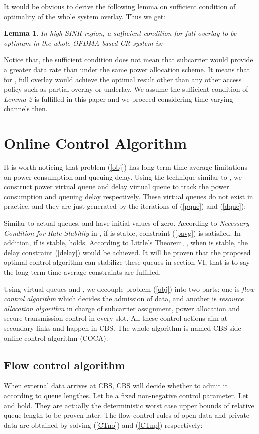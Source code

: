 \documentclass[journal]{IEEEtran}
\newtheorem{Lemma}{Lemma}
\begin{document}
 It would be obvious to derive the following lemma on sufficient condition of optimality of the whole system overlay.
 Thus we get:
 \begin{Lemma}
 In high SINR region, a sufficient condition for full overlay to be optimum in the whole OFDMA-based CR system is:

 \end{Lemma}

Notice that, the sufficient condition does not mean that subcarrier  would provide a greater data
rate than  under the same power allocation scheme. It means that for , full overlay would achieve the optimal result other than any other access policy such as partial
overlay or underlay.
 We assume the sufficient condition of \emph{Lemma 2} is fulfilled in this paper and we proceed considering time-varying
 channels then.
\section{Online Control Algorithm}
It is worth noticing that problem (\ref{obj}) has long-term time-average limitations on power consumption and queuing delay.
Using the technique similar to \cite{neely2010stochastic}, we construct power virtual queue   and delay virtual queue  to track the power consumption and queuing delay respectively. These virtual queues do not exist in practice, and
they are just generated by the iterations of (\ref{pque}) and (\ref{dque}):


Similar to actual queues,  and  have initial values of zero. According to \emph{Necessary Condition for Rate
Stability} in \cite{neely2010stochastic}, if    is stable, constraint (\ref{pavg}) is satisfied. In addition, if 
is stable,  holds.  According to Little's Theorem, ,  when  is stable, the
delay constraint (\ref{delay}) would be achieved.
It will be proven that the proposed optimal control algorithm can stabilize these queues in section VI, that is to say the
 long-term time-average constraints are fulfilled.


Using virtual queues  and , we decouple problem (\ref{obj}) into two parts: one is \emph{flow control
algorithm} which decides the admission of data, and another is \emph{resource allocation algorithm} in charge of
subcarrier assignment, power allocation and  secure transmission control in every slot. All these control actions aim at
secondary links and happen in CBS. The whole algorithm is named CBS-side online control algorithm (COCA).
\subsection{Flow control algorithm}
When external data arrives at CBS, CBS will decide whether to admit it according to queue lengthes. Let  be a fixed
non-negative control parameter. Let  and  hold. They are actually the
deterministic worst case upper bounds of relative queue length to be proven later. The flow control rules of open data and
private data are obtained by solving (\ref{CTno}) and (\ref{CTnp}) respectively:
  
\end{document}
